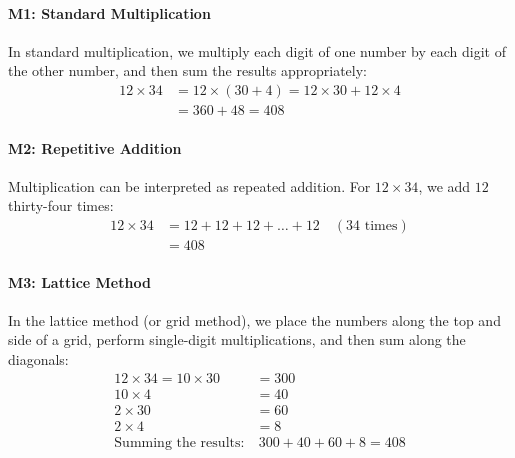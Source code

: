 \documentclass[11pt]{article}
\begin{document}
\paragraph{M1: Standard Multiplication}
In standard multiplication, we multiply each digit of one number by each digit of the other number, and then sum the results appropriately:
\begin{align*}
12 \times 34 &= 12 \times (30 + 4) = 12 \times 30 + 12 \times 4 \\
&= 360 + 48 = 408
\end{align*}
\paragraph{M2: Repetitive Addition}
Multiplication can be interpreted as repeated addition. For \(12 \times 34\), we add \(12\) thirty-four times:
\begin{align*}
12 \times 34 &= 12 + 12 + 12 + \dots + 12 \quad (\text{34 times}) \\
&= 408
\end{align*}
\paragraph{M3: Lattice Method}
In the lattice method (or grid method), we place the numbers along the top and side of a grid, perform single-digit multiplications, and then sum along the diagonals:
\begin{align*}
12 \times 34 = 10 \times 30 &= 300 \\
10 \times 4 &= 40 \\
2 \times 30 &= 60 \\
2 \times 4 &= 8 \\
\text{Summing the results:} &\ 300 + 40 + 60 + 8 = 408
\end{align*}
\end{document}

